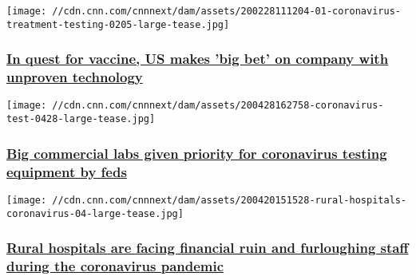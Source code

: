 \href{/2020/05/01/us/coronavirus-moderna-vaccine-invs/index.html}{}

\texttt{[image: //cdn.cnn.com/cnnnext/dam/assets/200228111204-01-coronavirus-treatment-testing-0205-large-tease.jpg]}

\hypertarget{in-quest-for-vaccine-us-makes-big-bet-on-company-with-unproven-technology-}{%
\subsubsection{\texorpdfstring{\href{/2020/05/01/us/coronavirus-moderna-vaccine-invs/index.html}{In
quest for vaccine, US makes 'big bet' on company with unproven
technology
}}{In quest for vaccine, US makes 'big bet' on company with unproven technology }}\label{in-quest-for-vaccine-us-makes-big-bet-on-company-with-unproven-technology-}}

\href{/2020/04/28/politics/testing-coronavirus-hospitals-commercial-labs-invs/index.html}{}

\texttt{[image: //cdn.cnn.com/cnnnext/dam/assets/200428162758-coronavirus-test-0428-large-tease.jpg]}

\hypertarget{big-commercial-labs-given-priority-for-coronavirus-testing-equipment-by-feds}{%
\subsubsection{\texorpdfstring{\href{/2020/04/28/politics/testing-coronavirus-hospitals-commercial-labs-invs/index.html}{Big
commercial labs given priority for coronavirus testing equipment by
feds}}{Big commercial labs given priority for coronavirus testing equipment by feds}}\label{big-commercial-labs-given-priority-for-coronavirus-testing-equipment-by-feds}}

\href{/2020/04/21/us/coronavirus-rural-hospitals-invs/index.html}{}

\texttt{[image: //cdn.cnn.com/cnnnext/dam/assets/200420151528-rural-hospitals-coronavirus-04-large-tease.jpg]}

\hypertarget{rural-hospitals-are-facing-financial-ruin-and-furloughing-staff-during-the-coronavirus-pandemic}{%
\subsubsection{\texorpdfstring{\href{/2020/04/21/us/coronavirus-rural-hospitals-invs/index.html}{Rural
hospitals are facing financial ruin and furloughing staff during the
coronavirus
pandemic}}{Rural hospitals are facing financial ruin and furloughing staff during the coronavirus pandemic}}\label{rural-hospitals-are-facing-financial-ruin-and-furloughing-staff-during-the-coronavirus-pandemic}}

